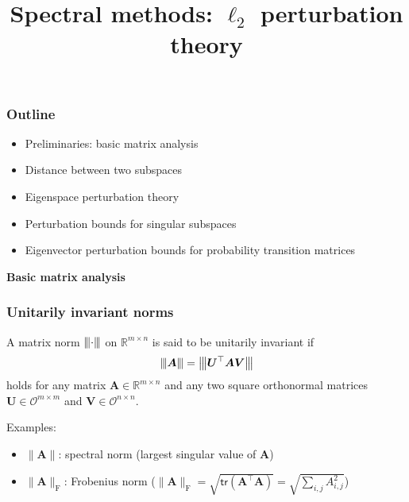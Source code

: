 \documentclass[compress,
mathserif,wide,%
]{beamer}
\title %
{Spectral methods: $\ell_2$ perturbation theory}
\begin{document}
\begin{frame}[plain]
  \titlepage

\end{frame}


\begin{frame}
\frametitle{Outline}

\begin{itemize}
  \itemsep1em
  \item Preliminaries: basic matrix analysis
  \item Distance between two subspaces
  \item Eigenspace perturbation theory
  \item Perturbation bounds for singular subspaces
  \item Eigenvector perturbation bounds for probability transition matrices
\end{itemize}

\end{frame}



\begin{frame}[plain]

\vfill
\begin{center}
  {\Large\bf Basic matrix analysis}

\end{center}
\vfill

\end{frame}


\begin{frame}
	\frametitle{Unitarily invariant norms}
	\begin{definition}
A matrix norm ${\left\vert\kern-0.25ex\left\vert\kern-0.25ex\left\vert \cdot \right\vert\kern-0.25ex\right\vert\kern-0.25ex\right\vert}$ on $\mathbb{R}^{m\times n}$ is said to be unitarily invariant if
%
\[
	{\left\vert\kern-0.25ex\left\vert\kern-0.25ex\left\vert \bm{A} \right\vert\kern-0.25ex\right\vert\kern-0.25ex\right\vert}={\big\vert\kern-0.25ex\big\vert\kern-0.25ex\big\vert \bm{U}^{\top}\bm{A}\bm{V} \big\vert\kern-0.25ex\big\vert\kern-0.25ex\big\vert}
\]
%
holds for any matrix $\bm{A}\in\mathbb{R}^{m\times n}$ and any two square orthonormal
matrices $\bm{U}\in\mathcal{O}^{m\times m}$ and $\bm{V}\in\mathcal{O}^{n\times n}$.
\end{definition}

\vfill

Examples: 
	\begin{itemize}
		\item $\|\bm{A}\|$: spectral norm (largest singular value of $\bm{A}$)
	
		\item $\|\bm{A}\|_{\mathrm{F}}$: Frobenius norm ($\|\bm{A}\|_{\mathrm{F}}= \sqrt{\mathsf{tr}(\bm{A}^{\top}\bm{A})}=\sqrt{\sum_{i,j}A_{i,j}^2}$)
	\end{itemize}
\end{frame}
\end{document}

